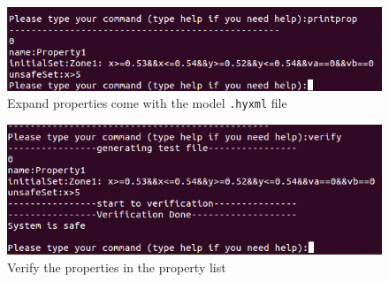 \documentclass{tufte-book} %
\begin{document}
\begin{figure}
 \centerline{\includegraphics[scale=.25,keepaspectratio=true]{Images/terminal_prop.png}}
 \caption{Expand properties come with the model \texttt{.hyxml} file} 
  \label{figure:terminalprop}
\end{figure}

\begin{figure}
 \centerline{\includegraphics[scale=.25,keepaspectratio=true]{Images/terminal_verify.png}}
 \caption{Verify the properties in the property list} 
  \label{figure:terminalverify}
\end{figure}





\appendix
\end{document}
